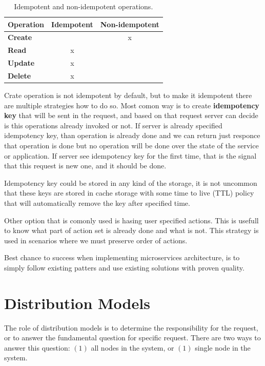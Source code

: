 \begin{table}[h!]
	\begin{center}
		\begin{tabular}{l|c|c}
			\textbf{Operation} & \textbf{Idempotent} & \textbf{Non-idempotent}\\
			\hline
			\textbf{Create} &  & x \\
			\textbf{Read} & x & \\
			\textbf{Update} & x & \\
			\textbf{Delete} & x & \\
		\end{tabular}
	\end{center}
	\vspace{-0.5cm}
	\caption{Idempotent and non-idempotent operations.}
	\label{tab:table8}
\end{table}

Crate operation is not idempotent by default, but to make it idempotent there are multiple strategies how to do so. Most comon way is to create \textbf{idempotency key} that will be sent in the request, and based on that request server can decide is this operations already invoked or not. If server is already  specified idempotency key, than operation is already done and we can return just responce that operation is done but no operation will be done over the state of the service or application. If server see idempotency key for the first time, that is the signal that this request is new one, and it should be done.

Idempotency key could be stored in any kind of the storage, it is not uncommon that these keys are stored in cache storage with some time to live (TTL) policy that will automatically remove the key after specified time.

Other option that is comonly used is hasing user specified actions. This is usefull to know what part of action set is already done and what is not. This strategy is used in scenarios where we must preserve order of actions.

Best chance to success when implementing microservices architecture, is to simply follow existing patters and use existing solutions with proven quality.
%
%
\section{Distribution Models}\label{sec:distribution_models}
%
The role of distribution models is to determine the responsibility for the request, or to answer the fundamental question  for specific request. There are two ways to answer this question: $(1)$ all nodes in the system, or $(1)$ single node in the system.
%
%
